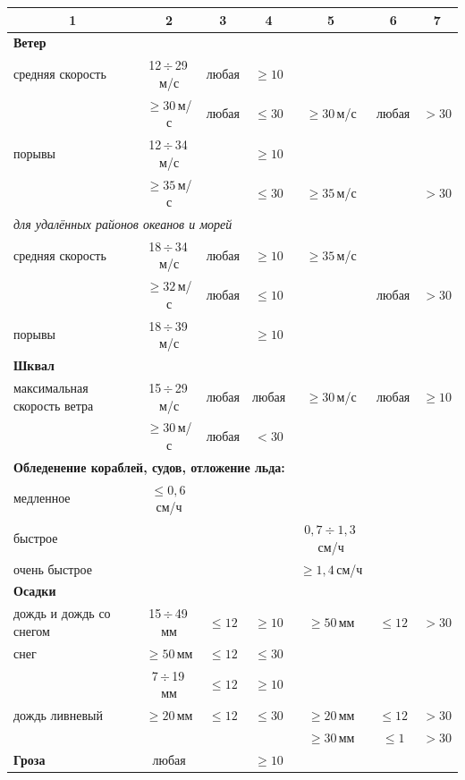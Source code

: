 \documentclass[a4paper, 12pt, twoside, final, book, russian, fittopage, cyremdash, openright]{ncc}
\newcommand{\mps}{\,м/с\xspace}
\newcommand{\otdo}{\,\ensuremath{\div}\,}
\begin{document}
\begin{longtable}{l|c|c|c|c|c|c}
  \endfirsthead
  \toprule[2pt]
  \multicolumn{1}{c|}{1} & 2 & 3 & 4 & 5 & 6 & 7 \\
  \midrule[2pt]
  \endhead
  \multicolumn{7}{l}{\textbf{Ветер}} \\*
  \midrule
  средняя скорость & 12\otdo29\mps & любая & $\geq10$ &               &       &        \\*
  {}               & $\geq30$\mps  & любая & $\leq30$ & $\geq30$\mps  & любая & $>30$  \\
  \midrule
  порывы           & 12\otdo34\mps &       & $\geq10$ &               &       &        \\*
  {}               & $\geq35$\mps  &       & $\leq30$ & $\geq35$\mps  &       & $>30$  \\
  \midrule
  \multicolumn{7}{l}{\textit{для удалённых районов океанов и морей}} \\*
  средняя скорость & 18\otdo34\mps & любая & $\geq10$ & $\geq35$\mps  &       &        \\*
  {}               & $\ge32$\mps   & любая & $\le10$  &               & любая & $>30$  \\
  \midrule
  порывы           & 18\otdo39\mps &       & $\ge10$  &               &       &        \\
  \midrule
  \multicolumn{7}{l}{\textbf{Шквал}} \\*
  \midrule
  максимальная скорость ветра
  {}               & 15\otdo29\mps & любая & любая    & $\ge30$\mps   & любая &$\ge10$ \\*
  {}               & $\ge30$\mps   & любая & $<30$    &               &       &        \\ 
  \midrule
  \multicolumn{7}{l}{\textbf{Обледенение кораблей, судов, отложение льда:}} \\*
  \midrule
  медленное        & $\le0,6$\,см/ч &      &          &               &       &         \\
  \midrule
  быстрое          &               &       &          & $0,7\div1,3$\,см/ч &  &         \\
  \midrule
  очень быстрое    &               &       &          & $\ge1,4$\,см/ч &      &         \\
  \midrule
  \multicolumn{7}{l}{\textbf{Осадки}} \\*
  \midrule
  дождь и дождь со снегом & 15\otdo49\,мм & $\le12$ & $\ge10$ & $\ge50$\,мм & $\le12$ & $>30$ \\
  \midrule
  снег             & $\ge50$\,мм   & $\le12$ & $\le30$ &               &      &         \\*
  {}               & 7\otdo19\,мм  & $\le12$ & $\ge10$ &               &      &         \\
  \midrule
  дождь ливневый   & $\ge20$\,мм   & $\le12$ & $\le30$ & $\ge20$\,мм   & $\le12$ & $>30$ \\*
  {}               &               &         &         & $\ge30$\,мм   & $\le1$ & $>30$ \\
  \midrule
  \textbf{Гроза}   & любая         &         & $\ge10$ &               &      &         \\


\end{longtable}
\end{document}
